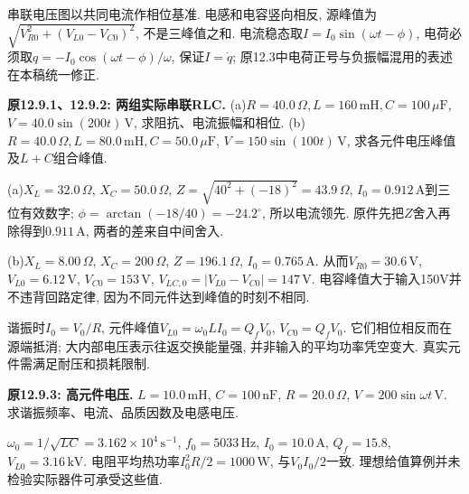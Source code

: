 \begin{center}
\end{center}
串联电压图以共同电流作相位基准. 电感和电容竖向相反, 源峰值为$\sqrt{V_{R0}^2+(V_{L0}-V_{C0})^2}$, 不是三峰值之和. 电流稳态取$I=I_0\sin(\omega t-\phi)$, 电荷必须取$q=-I_0\cos(\omega t-\phi)/\omega$, 保证$I=\dot q$; 原12.3中电荷正号与负振幅混用的表述在本稿统一修正.

\begin{example}
\textbf{原12.9.1、12.9.2: 两组实际串联RLC.} (a)$R=40.0\,\Omega,L=160\,\mathrm{mH},C=100\,\mu\mathrm F$, $V=40.0\sin(200t)\,\mathrm V$, 求阻抗、电流振幅和相位. (b)$R=40.0\,\Omega,L=80.0\,\mathrm{mH},C=50.0\,\mu\mathrm F$, $V=150\sin(100t)\,\mathrm V$, 求各元件电压峰值及$L+C$组合峰值.
\end{example}
\begin{solution}
(a)$X_L=32.0\,\Omega$, $X_C=50.0\,\Omega$, $Z=\sqrt{40^2+(-18)^2}=43.9\,\Omega$, $I_0=0.912\,\mathrm A$到三位有效数字; $\phi=\arctan(-18/40)=-24.2^\circ$, 所以电流领先. 原件先把$Z$舍入再除得到$0.911\,\mathrm A$, 两者的差来自中间舍入.

(b)$X_L=8.00\,\Omega$, $X_C=200\,\Omega$, $Z=196.1\,\Omega$, $I_0=0.765\,\mathrm A$. 从而$V_{R0}=30.6\,\mathrm V$, $V_{L0}=6.12\,\mathrm V$, $V_{C0}=153\,\mathrm V$, $V_{LC,0}=|V_{L0}-V_{C0}|=147\,\mathrm V$. 电容峰值大于输入150V并不违背回路定律, 因为不同元件达到峰值的时刻不相同.
\end{solution}

\label{tb:resonance-design}
谐振时$I_0=V_0/R$, 元件峰值$V_{L0}=\omega_0LI_0=Q_fV_0$, $V_{C0}=Q_fV_0$. 它们相位相反而在源端抵消; 大内部电压表示往返交换能量强, 并非输入的平均功率凭空变大. 真实元件需满足耐压和损耗限制.

\begin{example}
\textbf{原12.9.3: 高元件电压.} $L=10.0\,\mathrm{mH}$, $C=100\,\mathrm{nF}$, $R=20.0\,\Omega$, $V=200\sin\omega t\,\mathrm V$. 求谐振频率、电流、品质因数及电感电压.
\end{example}
\begin{solution}
$\omega_0=1/\sqrt{LC}=3.162\times10^4\,\mathrm{s^{-1}}$, $f_0=5033\,\mathrm{Hz}$, $I_0=10.0\,\mathrm A$, $Q_f=15.8$, $V_{L0}=3.16\,\mathrm{kV}$. 电阻平均热功率$I_0^2R/2=1000\,\mathrm W$, 与$V_0I_0/2$一致. 理想给值算例并未检验实际器件可承受这些值.
\end{solution}


